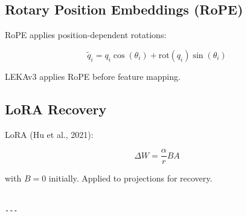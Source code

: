 \subsection{Rotary Position Embeddings (RoPE)}

RoPE applies position-dependent rotations:

\[
\tilde{q}_i = q_i \cos(\theta_i) + \text{rot}(q_i) \sin(\theta_i)
\tag{3.11}
\]

LEKAv3 applies RoPE before feature mapping.

\subsection{LoRA Recovery}

LoRA (Hu et al., 2021):

\[
\Delta W = \frac{\alpha}{r} B A
\tag{3.12}
\]

with $B = 0$ initially. Applied to projections for recovery.
\begin{lstlisting}

---
\end{lstlisting}